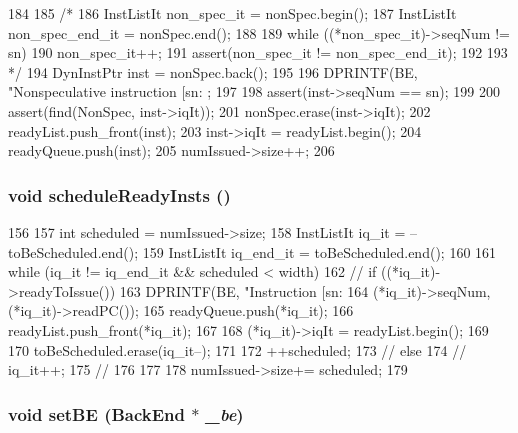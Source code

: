 \begin{DoxyCode}
184 {
185 /*
186     InstListIt non_spec_it = nonSpec.begin();
187     InstListIt non_spec_end_it = nonSpec.end();
188 
189     while ((*non_spec_it)->seqNum != sn) {
190         non_spec_it++;
191         assert(non_spec_it != non_spec_end_it);
192     }
193 */
194     DynInstPtr inst = nonSpec.back();
195 
196     DPRINTF(BE, "Nonspeculative instruction [sn:%
      ;
197 
198     assert(inst->seqNum == sn);
199 
200     assert(find(NonSpec, inst->iqIt));
201     nonSpec.erase(inst->iqIt);
202     readyList.push_front(inst);
203     inst->iqIt = readyList.begin();
204     readyQueue.push(inst);
205     numIssued->size++;
206 }
\end{DoxyCode}
\hypertarget{classBackEnd_1_1InstQueue_a3694e72427d3a616808797f9343d1fc4}{
\subsubsection[{scheduleReadyInsts}]{\setlength{\rightskip}{0pt plus 5cm}void scheduleReadyInsts ()}}
\label{classBackEnd_1_1InstQueue_a3694e72427d3a616808797f9343d1fc4}



\begin{DoxyCode}
156 {
157     int scheduled = numIssued->size;
158     InstListIt iq_it = --toBeScheduled.end();
159     InstListIt iq_end_it = toBeScheduled.end();
160 
161     while (iq_it != iq_end_it && scheduled < width) {
162 //        if ((*iq_it)->readyToIssue()) {
163             DPRINTF(BE, "Instruction [sn:%
164                     (*iq_it)->seqNum, (*iq_it)->readPC());
165             readyQueue.push(*iq_it);
166             readyList.push_front(*iq_it);
167 
168             (*iq_it)->iqIt = readyList.begin();
169 
170             toBeScheduled.erase(iq_it--);
171 
172             ++scheduled;
173 //        } else {
174 //            iq_it++;
175 //        }
176     }
177 
178     numIssued->size+= scheduled;
179 }
\end{DoxyCode}
\hypertarget{classBackEnd_1_1InstQueue_ac17b73ac697edccbae68bdb271673c35}{
\subsubsection[{setBE}]{\setlength{\rightskip}{0pt plus 5cm}void setBE ({\bf BackEnd} $\ast$ {\em \_\-be})}}
\label{classBackEnd_1_1InstQueue_ac17b73ac697edccbae68bdb271673c35}



